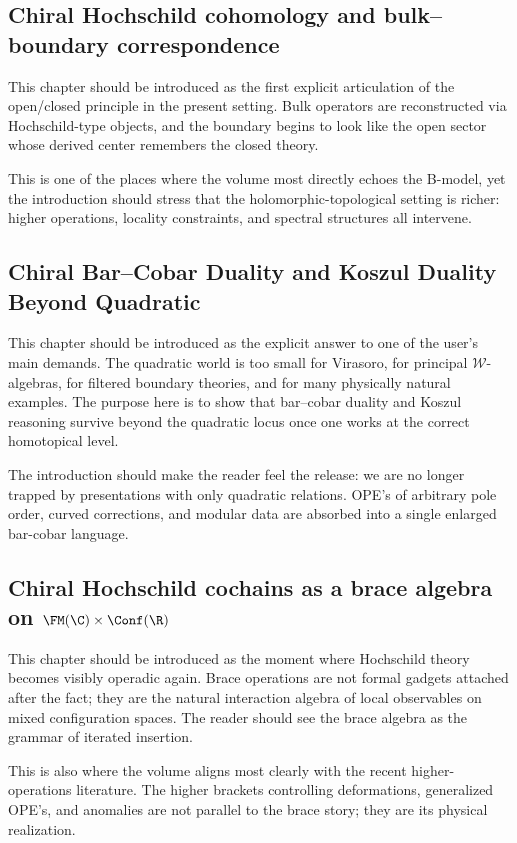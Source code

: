 \subsection*{Chiral Hochschild cohomology and bulk--boundary correspondence}
This chapter should be introduced as the first explicit articulation of the open/closed principle in the present setting.  Bulk operators are reconstructed via Hochschild-type objects, and the boundary begins to look like the open sector whose derived center remembers the closed theory.

This is one of the places where the volume most directly echoes the B-model, yet the introduction should stress that the holomorphic-topological setting is richer: higher operations, locality constraints, and spectral structures all intervene.

\subsection*{Chiral Bar--Cobar Duality and Koszul Duality Beyond Quadratic}
This chapter should be introduced as the explicit answer to one of the user's main demands.  The quadratic world is too small for Virasoro, for principal $\mathcal W$-algebras, for filtered boundary theories, and for many physically natural examples.  The purpose here is to show that bar--cobar duality and Koszul reasoning survive beyond the quadratic locus once one works at the correct homotopical level.

The introduction should make the reader feel the release: we are no longer trapped by presentations with only quadratic relations.  OPE's of arbitrary pole order, curved corrections, and modular data are absorbed into a single enlarged bar-cobar language.

\subsection*{Chiral Hochschild cochains as a brace algebra on $\FM(\C)\times\Conf(\R)$}
This chapter should be introduced as the moment where Hochschild theory becomes visibly operadic again.  Brace operations are not formal gadgets attached after the fact; they are the natural interaction algebra of local observables on mixed configuration spaces.  The reader should see the brace algebra as the grammar of iterated insertion.

This is also where the volume aligns most clearly with the recent higher-operations literature.  The higher brackets controlling deformations, generalized OPE's, and anomalies are not parallel to the brace story; they are its physical realization.

